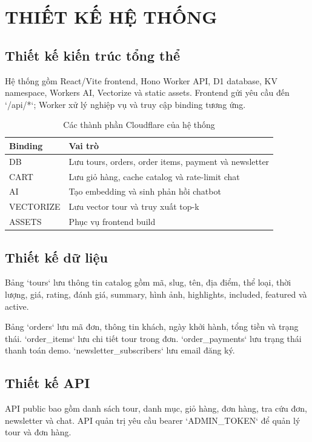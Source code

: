 \chapter{THIẾT KẾ HỆ THỐNG}

\section{Thiết kế kiến trúc tổng thể}
Hệ thống gồm React/Vite frontend, Hono Worker API, D1 database, KV namespace, Workers AI, Vectorize và static assets. Frontend gửi yêu cầu đến `/api/*`; Worker xử lý nghiệp vụ và truy cập binding tương ứng.

\begin{table}[H]
\centering
\caption{Các thành phần Cloudflare của hệ thống}
\label{tab:bindings}
\begin{tabular}{|l|p{9cm}|}
\hline
\textbf{Binding} & \textbf{Vai trò} \\
\hline
DB & Lưu tours, orders, order items, payment và newsletter \\
CART & Lưu giỏ hàng, cache catalog và rate-limit chat \\
AI & Tạo embedding và sinh phản hồi chatbot \\
VECTORIZE & Lưu vector tour và truy xuất top-k \\
ASSETS & Phục vụ frontend build \\
\hline
\end{tabular}
\end{table}

\section{Thiết kế dữ liệu}
Bảng `tours` lưu thông tin catalog gồm mã, slug, tên, địa điểm, thể loại, thời lượng, giá, rating, đánh giá, summary, hình ảnh, highlights, included, featured và active.

Bảng `orders` lưu mã đơn, thông tin khách, ngày khởi hành, tổng tiền và trạng thái. `order_items` lưu chi tiết tour trong đơn. `order_payments` lưu trạng thái thanh toán demo. `newsletter_subscribers` lưu email đăng ký.

\section{Thiết kế API}
API public bao gồm danh sách tour, danh mục, giỏ hàng, đơn hàng, tra cứu đơn, newsletter và chat. API quản trị yêu cầu bearer `ADMIN_TOKEN` để quản lý tour và đơn hàng.

